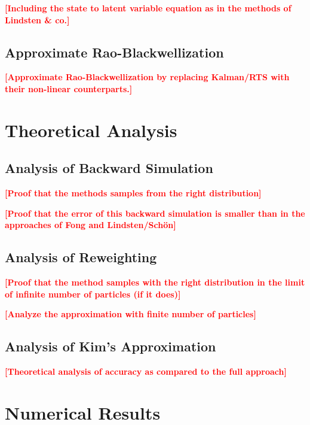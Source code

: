 \documentclass[twocolumn]{autart}    %
\newcommand{\comment}[1]{\textcolor{red}{\textbf{[#1]}}}
\begin{document}
\comment{Including the state to latent variable equation as in the
  methods of Lindsten \& co.}

\subsection{Approximate Rao-Blackwellization}

\comment{Approximate Rao-Blackwellization by replacing Kalman/RTS
with their non-linear counterparts.}




\section{Theoretical Analysis}

\subsection{Analysis of Backward Simulation}

\comment{Proof that the methods samples from the right distribution}

\comment{Proof that the error of this backward simulation
is smaller than in the approaches of Fong and Lindsten/Sch\"on}

\subsection{Analysis of Reweighting}

\comment{Proof that the method samples with the right distribution
in the limit of infinite number of particles (if it does)}

\comment{Analyze the approximation with finite number of particles}

\subsection{Analysis of Kim's Approximation}

\comment{Theoretical analysis of accuracy as compared to the full
  approach}


\section{Numerical Results}
\end{document}
